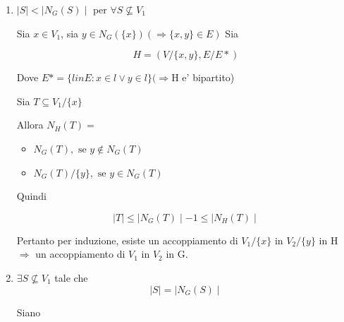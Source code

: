\documentclass{article}
\begin{document}
        \begin{enumerate}
          \item $\mid S \mid < \mid N_G(S) \mid$ per $\forall S \not \subseteq V_1$
            \begin{flushleft}
              Sia $x\in V_1$, sia $y\in N_G(\{x\})(\Rightarrow \{x,y\}\in E)$ Sia
            \end{flushleft}
            \begin{equation*}
              H=(V/ \{x,y\}, E/E*)
            \end{equation*}
            \begin{flushleft}
              Dove $E*=\{l in E: x\in l \lor y\in l \}(\Rightarrow $H e' bipartito)
            \end{flushleft}
            \begin{flushleft}
              Sia $T \subseteq V_1/\{x\}$
            \end{flushleft}
            \begin{flushleft}
              Allora $N_H(T)=$
            \end{flushleft}
            \begin{itemize}
              \item $N_G(T), \text{ se } y\notin N_G(T)$
              \item $N_G(T)/\{y\}, \text{ se } y\in N_G(T)$
            \end{itemize}
            \begin{flushleft}
              Quindi
            \end{flushleft}
            \begin{equation*}
              \mid T \mid \leq \mid N_G(T) \mid -1 \leq \mid N_H(T) \mid
            \end{equation*}
            \begin{flushleft}
              Pertanto per induzione, esiste un accoppiamento di $V_1 / \{x\}$ in $V_2/ \{y\}$ in H $\Rightarrow$ un accoppiamento di $V_1$ in $V_2$ in G.
            \end{flushleft}
          \item $\exists S \not \subseteq V_1$ tale che
            \begin{equation*}
              \mid S \mid = \mid N_G(S) \mid
            \end{equation*}
            \begin{flushleft}
              Siano
            \end{flushleft}
            \begin{equation*}

\end{equation*}
\end{enumerate}
\end{document}
